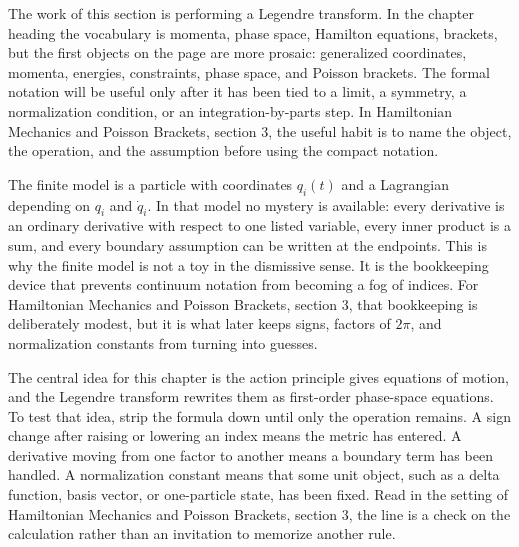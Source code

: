 











The work of this section is performing a Legendre transform.  In the chapter heading the vocabulary is momenta, phase space, Hamilton equations, brackets, but the first objects on the page are more prosaic: generalized coordinates, momenta, energies, constraints, phase space, and Poisson brackets.  The formal notation will be useful only after it has been tied to a limit, a symmetry, a normalization condition, or an integration-by-parts step.  In Hamiltonian Mechanics and Poisson Brackets, section 3, the useful habit is to name the object, the operation, and the assumption before using the compact notation.

The finite model is a particle with coordinates \(q_i(t)\) and a Lagrangian depending on \(q_i\) and \(\dot q_i\).  In that model no mystery is available: every derivative is an ordinary derivative with respect to one listed variable, every inner product is a sum, and every boundary assumption can be written at the endpoints.  This is why the finite model is not a toy in the dismissive sense.  It is the bookkeeping device that prevents continuum notation from becoming a fog of indices.  For Hamiltonian Mechanics and Poisson Brackets, section 3, that bookkeeping is deliberately modest, but it is what later keeps signs, factors of \(2\pi\), and normalization constants from turning into guesses.

The central idea for this chapter is the action principle gives equations of motion, and the Legendre transform rewrites them as first-order phase-space equations.  To test that idea, strip the formula down until only the operation remains.  A sign change after raising or lowering an index means the metric has entered.  A derivative moving from one factor to another means a boundary term has been handled.  A normalization constant means that some unit object, such as a delta function, basis vector, or one-particle state, has been fixed.  Read in the setting of Hamiltonian Mechanics and Poisson Brackets, section 3, the line is a check on the calculation rather than an invitation to memorize another rule.

